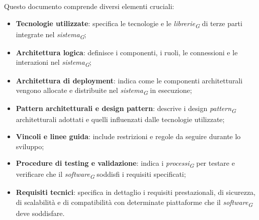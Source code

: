 Questo documento comprende diversi elementi cruciali: 
\begin{itemize}
    \item \textbf{Tecnologie utilizzate}: specifica le tecnologie e le \textit{librerie}\textsubscript{\textit{G}} di terze parti integrate nel \textit{sistema}\textsubscript{\textit{G}};
    \item \textbf{Architettura logica}: definisce i componenti, i ruoli, le connessioni e le interazioni nel \textit{sistema}\textsubscript{\textit{G}};
    \item \textbf{Architettura di deployment}: indica come le componenti architetturali vengono allocate e distribuite nel \textit{sistema}\textsubscript{\textit{G}} in esecuzione;
    \item \textbf{Pattern architetturali e design pattern}: descrive i design \textit{pattern}\textsubscript{\textit{G}} architetturali adottati e quelli influenzati dalle tecnologie utilizzate;
    \item \textbf{Vincoli e linee guida}: include restrizioni e regole da seguire durante lo sviluppo;
    \item \textbf{Procedure di testing e validazione}: indica i \textit{processi}\textsubscript{\textit{G}} per testare e verificare che il \textit{software}\textsubscript{\textit{G}} soddisfi i requisiti specificati;
    \item \textbf{Requisiti tecnici}: specifica in dettaglio i requisiti prestazionali, di sicurezza, di scalabilità e di compatibilità con determinate piattaforme che il \textit{software}\textsubscript{\textit{G}} deve soddisfare.
\end{itemize}

